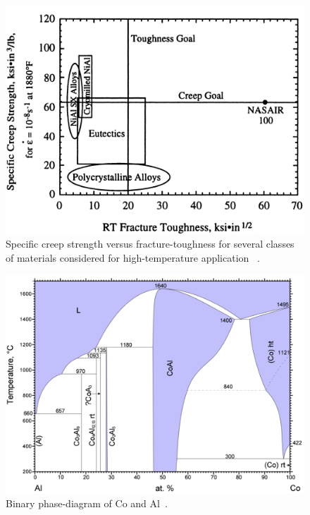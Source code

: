 %
\begin{figure}[H]
\begin{center}
\includegraphics[width=13cm]{darolia96}
\caption{Specific creep strength versus fracture-toughness for several classes of materials considered for high-temperature application ~\cite{darolia96}.}
\label{fig:darolia96}
\end{center}
\end{figure}
%

%
\begin{figure}[H]
\begin{center}
\includegraphics[width=14cm]{coal}
\caption{Binary phase-diagram of Co and Al~\cite{mcalister90}.}
\label{fig:coal}
\end{center}
\end{figure}
%


